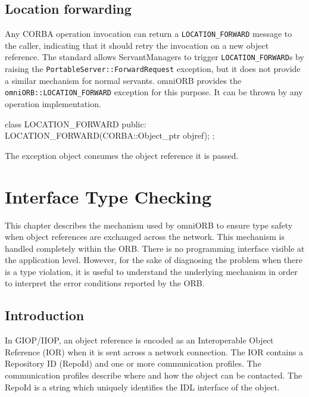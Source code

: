\documentclass[11pt,twoside,a4paper]{book}
\newcommand{\code}[1]{\texttt{#1}}
\begin{document}
\section{Location forwarding}
\label{sec:locationForward}

Any CORBA operation invocation can return a \code{LOCATION\_FORWARD}
message to the caller, indicating that it should retry the invocation
on a new object reference. The standard allows ServantManagers to
trigger \code{LOCATION\_FORWARD}s by raising the
\code{PortableServer::ForwardRequest} exception, but it does not
provide a similar mechanism for normal servants. omniORB provides the
\code{omniORB::LOCATION\_FORWARD} exception for this purpose. It can
be thrown by any operation implementation.

\begin{cxxlisting}
class LOCATION_FORWARD {
public:
  LOCATION_FORWARD(CORBA::Object_ptr objref);
};
\end{cxxlisting}

\noindent The exception object consumes the object reference it is
passed.




\chapter{Interface Type Checking}
\label{ch_intf}

This chapter describes the mechanism used by omniORB to ensure type
safety when object references are exchanged across the network. This
mechanism is handled completely within the ORB. There is no
programming interface visible at the application level. However, for
the sake of diagnosing the problem when there is a type violation, it
is useful to understand the underlying mechanism in order to interpret
the error conditions reported by the ORB.

\section{Introduction}

In GIOP/IIOP, an object reference is encoded as an Interoperable
Object Reference (IOR) when it is sent across a network connection.
The IOR contains a Repository ID (RepoId) and one or more
communication profiles. The communication profiles describe where and
how the object can be contacted. The RepoId is a string which uniquely
identifies the IDL interface of the object.
\end{document}
